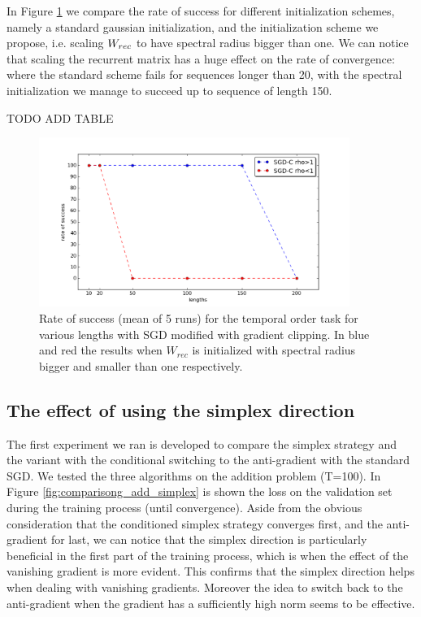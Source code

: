 In Figure \ref{fig:temporal_rates} we compare the rate of success for different initialization schemes, namely a standard gaussian initialization, and the initialization scheme we propose, i.e. scaling $W_{rec}$ to have spectral radius bigger than one. We can notice that scaling the recurrent matrix has a huge effect on the rate of convergence: where the standard scheme fails for sequences longer than 20, with the spectral initialization we manage to succeed up to sequence of length 150.

TODO ADD TABLE

\begin{figure}
	\centering
	\includegraphics[width= 0.9\textwidth]{chapter4/temporal_rates.png}
	\caption{Rate of success (mean of 5 runs) for the temporal order task for various lengths with SGD modified with gradient clipping. In blue and red the results when $W_{rec}$ is initialized with spectral radius bigger and smaller than one respectively.}
	\label{fig:temporal_rates}
\end{figure}



\subsection{The effect of using the simplex direction}
The first experiment we ran is developed to compare the simplex strategy and the variant with the conditional switching to the anti-gradient with the standard SGD. We tested the three algorithms on the addition problem (T=100). In Figure \ref{fig:comparisong_add_simplex} is shown the loss on the validation set during the training process (until convergence). Aside from the obvious consideration that the conditioned simplex strategy converges first, and the anti-gradient for last, we can notice that the simplex direction is particularly beneficial in the first part of the training process, which is when the effect of the vanishing gradient is more evident. This confirms that the simplex direction helps when dealing with vanishing gradients. Moreover the idea to switch back to the anti-gradient when the gradient has a sufficiently high norm seems to be effective.

